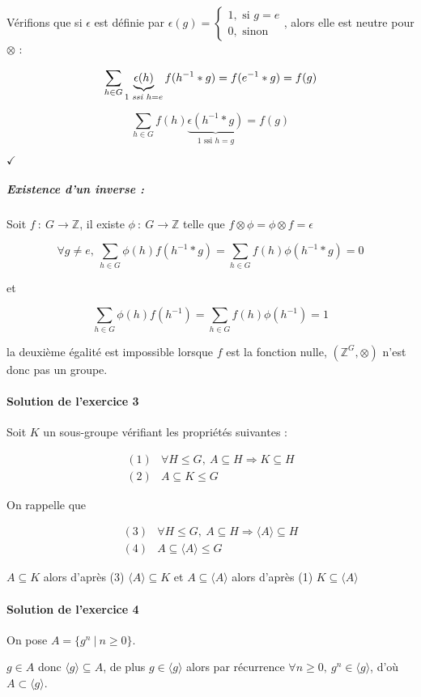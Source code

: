 \documentclass[]{article}
\theoremstyle{remark}
\theoremstyle{definition}
\newcommand{\checked}{
	\hfill$\checkmark$
}
\newcommand{\funcshort}[3]{
#1 ~ : ~ #2 \longrightarrow #3
}
\begin{document}
Vérifions que si $\epsilon$ est définie par $\epsilon(g) = \left\{
\begin{array}{l}
	1, \text{ si } g = e \\
	0, \text{ sinon}
\end{array}
\right.$, alors elle est neutre pour $\otimes$ :

$$\sum_{h \in G}\underbrace{\epsilon(h)}_{1 \text{ \textit{ssi} } h = e}f(h^{-1}*g) = f(e^{-1}*g) = f(g)$$

$$\sum_{h \in G}f(h)\underbrace{\epsilon(h^{-1}*g)}_{1 \text{ ssi } h = g}=f(g)$$

\checked

\subparagraph{Existence d'un inverse :}
Soit $\funcshort{f}{G}{\mathbb{Z}}$, il existe $\funcshort{\phi}{G}{\mathbb{Z}}$ telle que $f \otimes \phi = \phi \otimes f = \epsilon$

$$\forall g \neq e, ~ \sum_{h \in G}\phi(h)f(h^{-1}*g)=\sum_{h \in G}f(h)\phi(h^{-1}*g)=0$$

et

$$\sum_{h \in G}\phi(h)f(h^{-1})=\sum_{h \in G}f(h)\phi(h^{-1})=1$$

la deuxième égalité est impossible lorsque $f$ est la fonction nulle, $\left(\mathbb{Z}^G, \otimes\right)$ n'est donc pas un groupe.

\paragraph{Solution de l'exercice 3}
Soit $K$ un sous-groupe vérifiant les propriétés suivantes :

$$
	\begin{array}{lc}
		(1) & \forall H \leqslant G, ~ A \subseteq H \Longrightarrow K \subseteq H \\
		(2) & A \subseteq K \leqslant G
	\end{array}
$$

On rappelle que 

$$
	\begin{array}{lc}
		(3) & \forall H \leqslant G, ~ A \subseteq H \Longrightarrow \langle A \rangle \subseteq H \\
		(4) & A \subseteq \langle A \rangle \leqslant G
	\end{array}
$$

$A \subseteq K$ alors d'après (3) $\langle A \rangle \subseteq K$ et $A \subseteq \langle A \rangle$ alors d'après (1) $K \subseteq \langle A \rangle$

\paragraph{Solution de l'exercice 4}
On pose $A = \{g^n ~ | ~ n \geqslant 0\}$.

$g \in A$ donc $\langle g \rangle \subseteq A$, de plus $g \in \langle g \rangle$ alors par récurrence $\forall n \geqslant 0, ~ g^n \in \langle g \rangle$, d'où $A \subset \langle g \rangle$.
\end{document}
